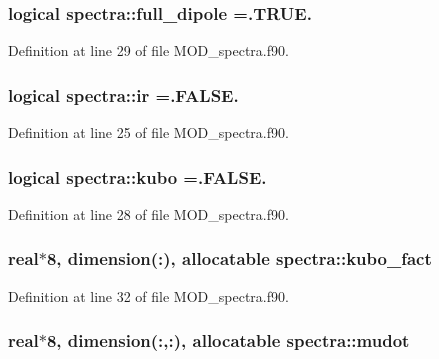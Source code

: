 \hypertarget{classspectra_a4212b9178886dd58ea98493c47fd2105}{
\subsubsection[{full\-\_\-dipole}]{\setlength{\rightskip}{0pt plus 5cm}logical spectra\-::full\-\_\-dipole =.T\-R\-U\-E.}}\label{classspectra_a4212b9178886dd58ea98493c47fd2105}


Definition at line 29 of file M\-O\-D\-\_\-spectra.\-f90.

\hypertarget{classspectra_a5adb3da0fc3d13e07cc600138acab1a8}{
\subsubsection[{ir}]{\setlength{\rightskip}{0pt plus 5cm}logical spectra\-::ir =.F\-A\-L\-S\-E.}}\label{classspectra_a5adb3da0fc3d13e07cc600138acab1a8}


Definition at line 25 of file M\-O\-D\-\_\-spectra.\-f90.

\hypertarget{classspectra_a3f9dbddf10012921dcfcf5e327d305c2}{
\subsubsection[{kubo}]{\setlength{\rightskip}{0pt plus 5cm}logical spectra\-::kubo =.F\-A\-L\-S\-E.}}\label{classspectra_a3f9dbddf10012921dcfcf5e327d305c2}


Definition at line 28 of file M\-O\-D\-\_\-spectra.\-f90.

\hypertarget{classspectra_a4b67bf04ee3bd6e5e2e9298513fc7ce2}{
\subsubsection[{kubo\-\_\-fact}]{\setlength{\rightskip}{0pt plus 5cm}real$\ast$8, dimension(\-:), allocatable spectra\-::kubo\-\_\-fact}}\label{classspectra_a4b67bf04ee3bd6e5e2e9298513fc7ce2}


Definition at line 32 of file M\-O\-D\-\_\-spectra.\-f90.

\hypertarget{classspectra_a4641a93b8f40f9249290064866db7b00}{
\subsubsection[{mudot}]{\setlength{\rightskip}{0pt plus 5cm}real$\ast$8, dimension(\-:,\-:), allocatable spectra\-::mudot}}\label{classspectra_a4641a93b8f40f9249290064866db7b00}


